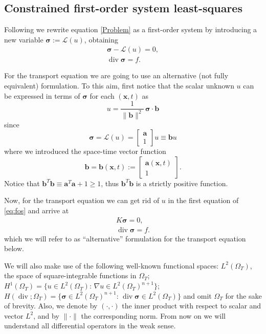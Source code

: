 \documentclass[a4paper,12pt]{amsart}
\numberwithin{equation}{section}
\renewcommand{\div}{\operatorname{div}}
\def\bu{{\mathbf a}} %
\def\bb{{\mathbf b}}
\renewcommand{\L}{{\mathcal L}}
\def\XVec#1{{\mathbf #1}}
\def\Xx{\XVec{x}}
\def\bsigma{{\boldsymbol \sigma}}
\begin{document}
\subsection{Constrained first-order system least-squares} 
Following \cite{neumueller_vassilevski_villa} we rewrite equation \eqref{Problem} as a first-order system by introducing a new variable $\bsigma := \L(u)$, 
obtaining 
\begin{equation}
\begin{array}{c}
\bsigma - \L(u)  = 0,  \\ 
\div \bsigma = f. 
\end{array}
\label{eq:fos} 
\end{equation}

For the transport equation we are going to use an alternative (not fully equivalent) formulation. To this aim, first notice that the scalar unknown $u$ can be expressed in terms of $\bsigma$ for each $(\Xx,t)$ as
\begin{equation}
\label{eq:S}
u = \frac{1}{\| \bb \|^2 } \, \bsigma \cdot \bb
\end{equation}
since
$$
\bsigma = \L(u) = \left[ \begin{array}{c} \bu \\ 1 \end{array} \right] u \equiv \bb u
$$
where we introduced the space-time vector function
\[
\bb = \bb(\Xx,t) := \begin{bmatrix} \bu(\Xx,t) \\ 1 \end{bmatrix}.
\]
Notice that $\bb^T\bb \equiv \bu^T\bu+1 \ge 1$, thus $\bb^T\bb$ is a strictly positive function.

Now, for the transport equation we can get rid of $u$ in the first equation of \eqref{eq:fos} and arrive at
\begin{equation}
\begin{array}{c}
K \bsigma = 0,  \\ 
\div \bsigma = f. 
\end{array}
\label{eq:alt_fos} 
\end{equation}
which we will refer to as ``alternative'' formulation for the transport equation below.

We will also make use of the following well-known functional spaces: $L^2(\Omega_T)$, the space of square-integrable functions in $\Omega_T$; $H^1(\Omega_T) = \{ u \in L^2(\Omega_T) : \, \nabla u \in L^2(\Omega_T)^{n+1} \} $; $H(\div; \Omega_T) = \{ \bsigma \in L^2(\Omega_T)^{n+1} : \, \div \bsigma \in L^2(\Omega_T) \}$ and omit $\Omega_T$ for the sake of brevity. Also, we denote by  $(\cdot,\cdot)$ the inner product with respect to scalar and vector $L^2$, and by $\|\cdot \|$ the corresponding norm. From now on we will understand all differential operators in the weak sense. %
\end{document}
